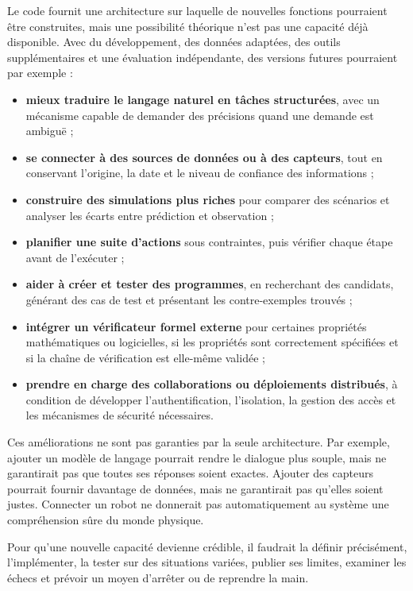 \documentclass[11pt,a4paper]{article}
\begin{document}
Le code fournit une architecture sur laquelle de nouvelles fonctions pourraient être construites, mais une possibilité théorique n'est pas une capacité déjà disponible. Avec du développement, des données adaptées, des outils supplémentaires et une évaluation indépendante, des versions futures pourraient par exemple :
\begin{itemize}
  \item \textbf{mieux traduire le langage naturel en tâches structurées}, avec un mécanisme capable de demander des précisions quand une demande est ambiguë ;
  \item \textbf{se connecter à des sources de données ou à des capteurs}, tout en conservant l'origine, la date et le niveau de confiance des informations ;
  \item \textbf{construire des simulations plus riches} pour comparer des scénarios et analyser les écarts entre prédiction et observation ;
  \item \textbf{planifier une suite d'actions} sous contraintes, puis vérifier chaque étape avant de l'exécuter ;
  \item \textbf{aider à créer et tester des programmes}, en recherchant des candidats, générant des cas de test et présentant les contre-exemples trouvés ;
  \item \textbf{intégrer un vérificateur formel externe} pour certaines propriétés mathématiques ou logicielles, si les propriétés sont correctement spécifiées et si la chaîne de vérification est elle-même validée ;
  \item \textbf{prendre en charge des collaborations ou déploiements distribués}, à condition de développer l'authentification, l'isolation, la gestion des accès et les mécanismes de sécurité nécessaires.
\end{itemize}

Ces améliorations ne sont pas garanties par la seule architecture. Par exemple, ajouter un modèle de langage pourrait rendre le dialogue plus souple, mais ne garantirait pas que toutes ses réponses soient exactes. Ajouter des capteurs pourrait fournir davantage de données, mais ne garantirait pas qu'elles soient justes. Connecter un robot ne donnerait pas automatiquement au système une compréhension sûre du monde physique.

Pour qu'une nouvelle capacité devienne crédible, il faudrait la définir précisément, l'implémenter, la tester sur des situations variées, publier ses limites, examiner les échecs et prévoir un moyen d'arrêter ou de reprendre la main.
\end{document}
